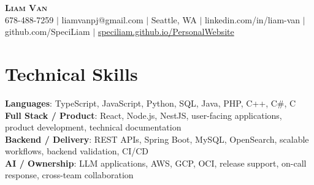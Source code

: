 \documentclass[letterpaper,11pt]{article}
\begin{document}

%
\begin{center}
    \textbf{\Huge \scshape Liam Van} \\ \vspace{1pt}
    \small 678-488-7259 $|$ \small {liamvanpj@gmail.com} $|$ Seattle, WA
 {{$|$ linkedin.com/in/liam-van} {$|$ github.com/SpeciLiam} {$|$ \href{https://speciliam.github.io/PersonalWebsite}{speciliam.github.io/PersonalWebsite}}}

\end{center}

\section{Technical Skills}
 \begin{itemize}[leftmargin=0.15in, label={}]
    \small{\item{
     \textbf{Languages}{: TypeScript, JavaScript, Python, SQL, Java, PHP, C++, C\#, C} \\
     \textbf{Full Stack / Product}{: React, Node.js, NestJS, user-facing applications, product development, technical documentation} \\
     \textbf{Backend / Delivery}{: REST APIs, Spring Boot, MySQL, OpenSearch, scalable workflows, backend validation, CI/CD} \\
     \textbf{AI / Ownership}{: LLM applications, AWS, GCP, OCI, release support, on-call response, cross-team collaboration} \\
    }}
 \end{itemize}
%
\end{document}
